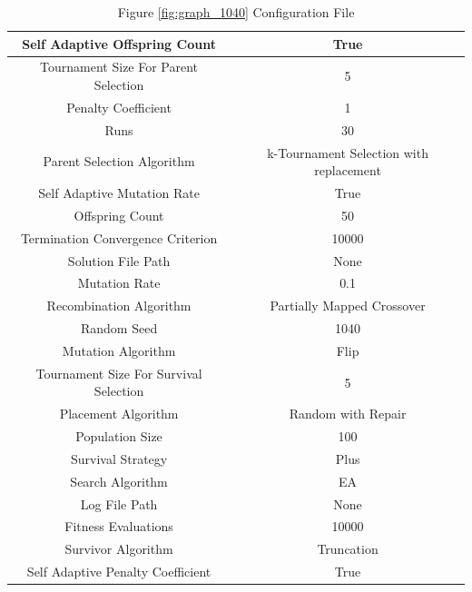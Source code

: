 \documentclass{standalone}
\begin{document}
\begin{table}[!htb]
	\centering
	\caption{Figure \ref{fig:graph_1040} Configuration File}
	\label{tab:graph_1040}
	\begin{tabular}{| c | c |}
		\hline
		Self Adaptive Offspring Count		& True		 \\
		\hline
		Tournament Size For Parent Selection		& 5		 \\
		\hline
		Penalty Coefficient		& 1		 \\
		\hline
		Runs		& 30		 \\
		\hline
		Parent Selection Algorithm		& k-Tournament Selection with replacement		 \\
		\hline
		Self Adaptive Mutation Rate		& True		 \\
		\hline
		Offspring Count		& 50		 \\
		\hline
		Termination Convergence Criterion		& 10000		 \\
		\hline
		Solution File Path		& None		 \\
		\hline
		Mutation Rate		& 0.1		 \\
		\hline
		Recombination Algorithm		& Partially Mapped Crossover		 \\
		\hline
		Random Seed		& 1040		 \\
		\hline
		Mutation Algorithm		& Flip		 \\
		\hline
		Tournament Size For Survival Selection		& 5		 \\
		\hline
		Placement Algorithm		& Random with Repair		 \\
		\hline
		Population Size		& 100		 \\
		\hline
		Survival Strategy		& Plus		 \\
		\hline
		Search Algorithm		& EA		 \\
		\hline
		Log File Path		& None		 \\
		\hline
		Fitness Evaluations		& 10000		 \\
		\hline
		Survivor Algorithm		& Truncation		 \\
		\hline
		Self Adaptive Penalty Coefficient		& True		 \\
		\hline
	\end{tabular}
\end{table}
\end{document}
